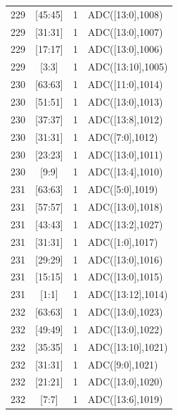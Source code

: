 \begin{longtable}{@{}r c r p{9.5cm}@{}}
229 & [45:45] & 1 & ADC([13:0],1008) \\
229 & [31:31] & 1 & ADC([13:0],1007) \\
229 & [17:17] & 1 & ADC([13:0],1006) \\
229 & [3:3] & 1 & ADC([13:10],1005) \\
230 & [63:63] & 1 & ADC([11:0],1014) \\
230 & [51:51] & 1 & ADC([13:0],1013) \\
230 & [37:37] & 1 & ADC([13:8],1012) \\
230 & [31:31] & 1 & ADC([7:0],1012) \\
230 & [23:23] & 1 & ADC([13:0],1011) \\
230 & [9:9] & 1 & ADC([13:4],1010) \\
231 & [63:63] & 1 & ADC([5:0],1019) \\
231 & [57:57] & 1 & ADC([13:0],1018) \\
231 & [43:43] & 1 & ADC([13:2],1027) \\
231 & [31:31] & 1 & ADC([1:0],1017) \\
231 & [29:29] & 1 & ADC([13:0],1016) \\
231 & [15:15] & 1 & ADC([13:0],1015) \\
231 & [1:1] & 1 & ADC([13:12],1014) \\
232 & [63:63] & 1 & ADC([13:0],1023) \\
232 & [49:49] & 1 & ADC([13:0],1022) \\
232 & [35:35] & 1 & ADC([13:10],1021) \\
232 & [31:31] & 1 & ADC([9:0],1021) \\
232 & [21:21] & 1 & ADC([13:0],1020) \\
232 & [7:7] & 1 & ADC([13:6],1019) \\
\end{longtable}
\label{tab:payload}